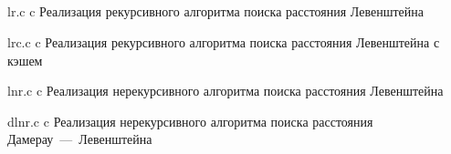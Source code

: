 \begin{appendices}
	\chapter{}
    {lr.c}
    {c}
    {Реализация рекурсивного алгоритма поиска расстояния Левенштейна}

    \newpage

    {lrc.c}
    {c}
    {Реализация рекурсивного алгоритма поиска расстояния Левенштейна с кэшем}

    \newpage

    {lnr.c}
    {c}
    {Реализация нерекурсивного алгоритма поиска расстояния Левенштейна}

    \newpage
    
    {dlnr.c}
    {c}
    {Реализация нерекурсивного алгоритма поиска расстояния Дамерау~---~Левенштейна}
	
\end{appendices}
